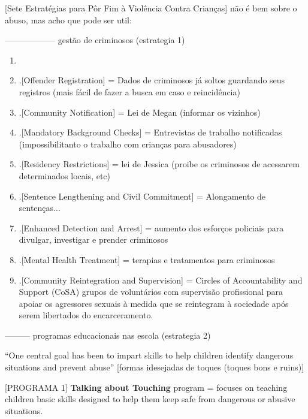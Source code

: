 [Sete Estratégias para Pôr Fim à Violência Contra Crianças] não é bem sobre o abuso, mas acho que pode ser util: %


------------------  gestão de criminosos (estrategia 1)

\begin{enumerate}
  \item \cite{finkelhor2009prevention}

\item .[Offender Registration] = Dados de criminosos já soltos guardando seus registros (mais fácil de fazer a busca em caso e reincidência)

\item .[Community Notification] = Lei de Megan (informar os vizinhos)

\item .[Mandatory Background Checks] = Entrevistas de trabalho notificadas (impossibilitanto o trabalho com crianças para abusadores)

\item .[Residency Restrictions] = lei de Jessica (proibe os criminosos de acessarem determinados locais, etc)

\item .[Sentence Lengthening and Civil Commitment] = Alongamento de sentenças...

\item .[Enhanced Detection and Arrest] = aumento dos esforços policiais para divulgar, investigar e prender criminosos

\item .[Mental Health Treatment] = terapias e tratamentos para criminosos

\item .[Community Reintegration and Supervision] = Circles of Accountability and Support (CoSA) grupos de voluntários com supervisão profissional para apoiar os agressores sexuais à medida que se reintegram à sociedade após serem libertados do encarceramento.
\end{enumerate}

--------- programas educacionais nas escola (estrategia 2)

``One central goal has been to impart skills to help children identify dangerous situations and prevent abuse'' \cite{finkelhor2009prevention} [formas idesejadas de toques (toques bons e ruins)]

[PROGRAMA 1] \textbf{Talking about Touching} program =  focuses on teaching children basic skills designed to help them keep safe from dangerous or abusive situations. \cite{finkelhor2009prevention} %

